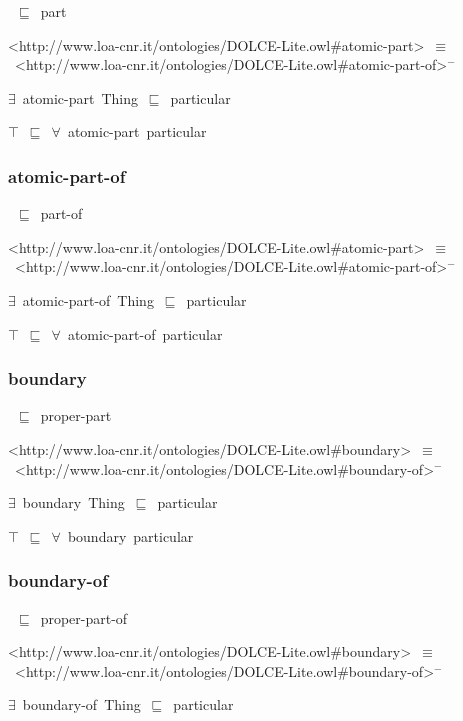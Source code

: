 \documentclass{article}
\begin{document}
~\ensuremath{\sqsubseteq}~part

<http://www.loa-cnr.it/ontologies/DOLCE-Lite.owl#atomic-part>~\ensuremath{\equiv}~<http://www.loa-cnr.it/ontologies/DOLCE-Lite.owl#atomic-part-of>\ensuremath{^-}

\ensuremath{\exists}~atomic-part~Thing~\ensuremath{\sqsubseteq}~particular

\ensuremath{\top}~\ensuremath{\sqsubseteq}~\ensuremath{\forall}~atomic-part~particular

\subsubsection*{atomic-part-of}

~\ensuremath{\sqsubseteq}~part-of

<http://www.loa-cnr.it/ontologies/DOLCE-Lite.owl#atomic-part>~\ensuremath{\equiv}~<http://www.loa-cnr.it/ontologies/DOLCE-Lite.owl#atomic-part-of>\ensuremath{^-}

\ensuremath{\exists}~atomic-part-of~Thing~\ensuremath{\sqsubseteq}~particular

\ensuremath{\top}~\ensuremath{\sqsubseteq}~\ensuremath{\forall}~atomic-part-of~particular

\subsubsection*{boundary}

~\ensuremath{\sqsubseteq}~proper-part

<http://www.loa-cnr.it/ontologies/DOLCE-Lite.owl#boundary>~\ensuremath{\equiv}~<http://www.loa-cnr.it/ontologies/DOLCE-Lite.owl#boundary-of>\ensuremath{^-}

\ensuremath{\exists}~boundary~Thing~\ensuremath{\sqsubseteq}~particular

\ensuremath{\top}~\ensuremath{\sqsubseteq}~\ensuremath{\forall}~boundary~particular

\subsubsection*{boundary-of}

~\ensuremath{\sqsubseteq}~proper-part-of

<http://www.loa-cnr.it/ontologies/DOLCE-Lite.owl#boundary>~\ensuremath{\equiv}~<http://www.loa-cnr.it/ontologies/DOLCE-Lite.owl#boundary-of>\ensuremath{^-}

\ensuremath{\exists}~boundary-of~Thing~\ensuremath{\sqsubseteq}~particular
\end{document}
